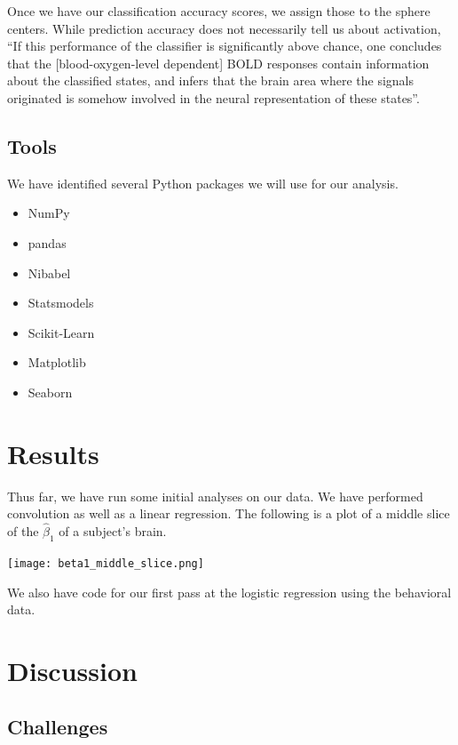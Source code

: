 \documentclass[11pt]{article}
\begin{document}
Once we have our classification accuracy scores, we assign those to the sphere
centers. While prediction accuracy does not necessarily tell us about
activation, ``If this performance of the classifier is significantly above
chance, one concludes that the [blood-oxygen-level dependent] BOLD responses
contain information about the classified states, and infers that the brain area
where the signals originated is somehow involved in the neural representation
of these states''\cite{schreiber2013statistical}.

\subsection{Tools}

We have identified several Python packages we will use for our analysis.

\begin{itemize}
  \item{NumPy}
  \item{pandas}
  \item{Nibabel}
  \item{Statsmodels}
  \item{Scikit-Learn}
  \item{Matplotlib}
  \item{Seaborn}
\end{itemize}

\section{Results}

Thus far, we have run some initial analyses on our data. We have performed
convolution as well as a linear regression. The following is a plot of a middle
slice of the $\hat{\beta}_1$ of a subject's brain.

\texttt{[image: beta1\_middle\_slice.png]}

We also have code for our first pass at the logistic regression using the
behavioral data.

\section{Discussion}

\subsection{Challenges}
\end{document}
